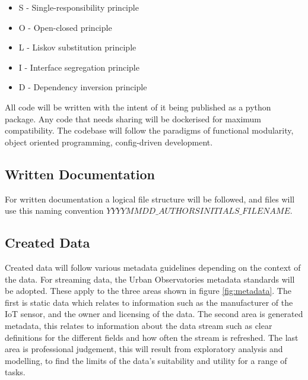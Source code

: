 \documentclass[a4paper, 11pt]{article}
\begin{document}
\begin{itemize}
    \item S - Single-responsibility principle
    \item O - Open-closed principle
    \item L - Liskov substitution principle
    \item I - Interface segregation principle
    \item D - Dependency inversion principle
\end{itemize}

All code will be written with the intent of it being published as a python package. Any code that needs sharing will be dockerised for maximum compatibility. The codebase will follow the paradigms of functional modularity, object oriented programming, config-driven development.

\subsection{Written Documentation}

For written documentation a logical file structure will be followed, and files will use this naming convention $YYYYMMDD\_AUTHORSINITIALS\_FILENAME$.

\subsection{Created Data}

Created data will follow various metadata guidelines depending on the context of the data. For streaming data, the Urban Observatories metadata standards will be adopted. These apply to the three areas shown in figure \ref{fig:metadata}. The first is static data which relates to information such as the manufacturer of the IoT sensor, and the owner and licensing of the data. The second area is generated metadata, this relates to information about the data stream such as clear definitions for the different fields and how often the stream is refreshed. The last area is professional judgement, this will result from exploratory analysis and modelling, to find the limits of the data’s suitability and utility for a range of tasks.
\end{document}
